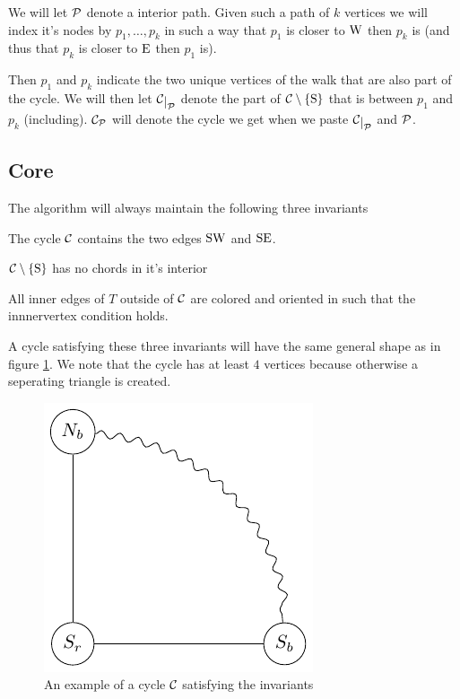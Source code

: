 We will let $\P$ denote a interior path. Given such a path of $k$ vertices we will index it's nodes by $p_1, \ldots, p_k$ in such a way that $p_1$ is closer to $\pW$ then $p_k$ is (and thus that $p_k$ is closer to $\pE$ then $p_1$ is).

Then $p_1$ and $p_k$ indicate the two unique vertices of the walk that are also part of the cycle. We will then let $\restC{\P}$ denote the part of $\cpath$ that is between $p_1$ and $p_k$ (including). $\C_\P$ will denote the cycle we get when we paste $\restC{\P}$ and $\P$.



\subsection{Core}
\label{ss:core}

The algorithm will always maintain the following three invariants

\begin{invariants}
  \itemsep=-4pt

\item \label{i:1} The cycle $\C$ contains the two edges $\pS \pW$ and $\pS \pE$.
\item \label{i:noChords} $\cpath$ has no chords in it's interior 
\item \label{i:last} All inner edges of $T$ outside of $\C$ are colored and oriented in such that the innnervertex condition holds. %
\end{invariants}

A cycle satisfying these three invariants will have the same general shape as in figure \ref{fig:invCycle}. We note that the cycle has at least $4$ vertices because otherwise a seperating triangle is created.

\begin{figure}[h!]
\centering
\includegraphics{algo/img/invCycle}

\caption{An example of a cycle $\C$ satisfying the invariants
    \label{fig:invCycle}}
\end{figure}

